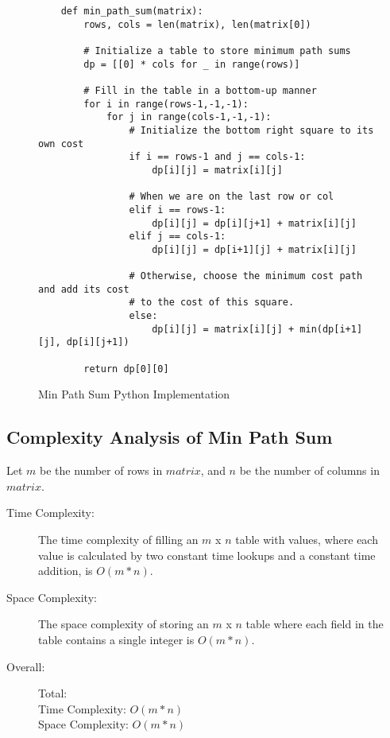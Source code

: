 \begin{figure}[H]
    \centering
    \begin{lstlisting}
    def min_path_sum(matrix):
        rows, cols = len(matrix), len(matrix[0])
        
        # Initialize a table to store minimum path sums
        dp = [[0] * cols for _ in range(rows)]
    
        # Fill in the table in a bottom-up manner
        for i in range(rows-1,-1,-1):
            for j in range(cols-1,-1,-1):
                # Initialize the bottom right square to its own cost
                if i == rows-1 and j == cols-1:
                    dp[i][j] = matrix[i][j]
    
                # When we are on the last row or col
                elif i == rows-1:
                    dp[i][j] = dp[i][j+1] + matrix[i][j]
                elif j == cols-1:
                    dp[i][j] = dp[i+1][j] + matrix[i][j]
    
                # Otherwise, choose the minimum cost path and add its cost
                # to the cost of this square.
                else:
                    dp[i][j] = matrix[i][j] + min(dp[i+1][j], dp[i][j+1])
    
        return dp[0][0]
    \end{lstlisting}
    \caption{Min Path Sum Python Implementation}
    \label{fig:min-path-sum}
\end{figure}

\subsection{Complexity Analysis of Min Path Sum}
Let $m$ be the number of rows in $matrix$, and $n$ be the number of columns in $matrix$.

\begin{description}
    \item[Time Complexity:]
        The time complexity of filling an $m$ x $n$ table with values,
        where each value is calculated by two constant time lookups and a constant time addition, is $O(m * n)$.
        
    \item[Space Complexity:] 
        The space complexity of storing an $m$ x $n$ table where each field in the table contains a single integer is $O(m * n)$.
        
    \item[Overall:] Total:\\
        Time Complexity: $O(m * n)$\\
        Space Complexity: $O(m * n)$
    
\end{description}

